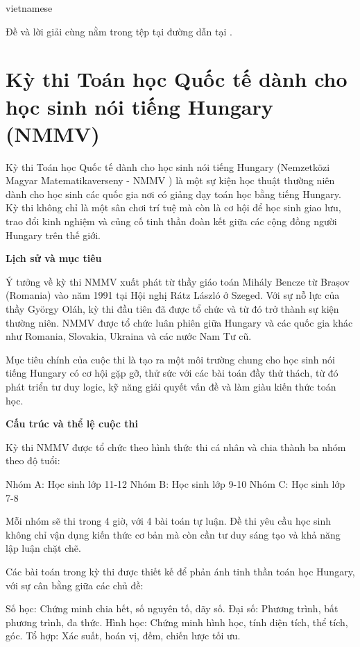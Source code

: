 \documentclass{article}
\begin{document}
\begin{otherlanguage*}{vietnamese}
\begin{remark*}
    Đề và lời giải cùng nằm trong tệp tại đường dẫn tại \cite{AD_2024}.
\end{remark*}

\newpage

\section{Kỳ thi Toán học Quốc tế dành cho học sinh nói tiếng Hungary (NMMV)}

Kỳ thi Toán học Quốc tế dành cho học sinh nói tiếng Hungary (Nemzetközi Magyar Matematikaverseny - NMMV \cite{NMMV})
là một sự kiện học thuật thường niên dành cho học sinh các quốc gia nơi có giảng dạy toán học bằng tiếng Hungary.
Kỳ thi không chỉ là một sân chơi trí tuệ mà còn là cơ hội để học sinh giao lưu,
trao đổi kinh nghiệm và củng cố tinh thần đoàn kết giữa các cộng đồng người Hungary trên thế giới.

\textbf{Lịch sử và mục tiêu}

Ý tưởng về kỳ thi NMMV xuất phát từ thầy giáo toán Mihály Bencze từ Brașov (Romania) vào năm 1991 tại Hội nghị Rátz László ở Szeged.
Với sự nỗ lực của thầy György Oláh, kỳ thi đầu tiên đã được tổ chức và từ đó trở thành sự kiện thường niên.
NMMV được tổ chức luân phiên giữa Hungary và các quốc gia khác như Romania, Slovakia, Ukraina và các nước Nam Tư cũ.

Mục tiêu chính của cuộc thi là tạo ra một môi trường chung cho học sinh nói tiếng Hungary có cơ hội gặp gỡ, thử sức với các bài toán đầy thử thách,
từ đó phát triển tư duy logic, kỹ năng giải quyết vấn đề và làm giàu kiến thức toán học.

\textbf{Cấu trúc và thể lệ cuộc thi}

Kỳ thi NMMV được tổ chức theo hình thức thi cá nhân và chia thành ba nhóm theo độ tuổi:
\begin{enumerate}[topsep=0pt, partopsep=0pt, itemsep=0pt]
    \ii Nhóm A: Học sinh lớp 11-12
    \ii Nhóm B: Học sinh lớp 9-10
    \ii Nhóm C: Học sinh lớp 7-8
\end{enumerate}

Mỗi nhóm sẽ thi trong 4 giờ, với 4 bài toán tự luận. Đề thi yêu cầu học sinh không chỉ vận dụng kiến thức cơ bản mà còn cần tư duy sáng tạo và khả năng lập luận chặt chẽ.

Các bài toán trong kỳ thi được thiết kế để phản ánh tinh thần toán học Hungary, với sự cân bằng giữa các chủ đề:
\begin{itemize}[topsep=0pt, partopsep=0pt, itemsep=0pt]
    \ii Số học: Chứng minh chia hết, số nguyên tố, dãy số.
    \ii Đại số: Phương trình, bất phương trình, đa thức.
    \ii Hình học: Chứng minh hình học, tính diện tích, thể tích, góc.
    \ii Tổ hợp: Xác suất, hoán vị, đếm, chiến lược tối ưu.
\end{itemize}


\end{otherlanguage*}
\end{document}
